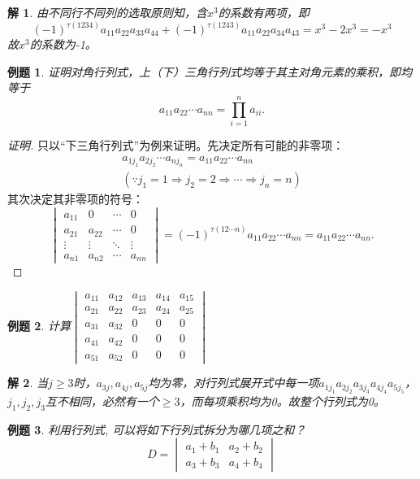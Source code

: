\documentclass[a4paper]{book}
\newtheorem{eg}{例题}[chapter]
\newtheorem*{solution}{解}
\begin{document}
\begin{solution}
由不同行不同列的选取原则知，含$x^3$的系数有两项，即
$$(-1)^{\tau(1234)} a_{11}a_{22}a_{33}a_{44} + (-1)^{\tau(1243)} a_{11}a_{22}a_{34}a_{43} = x^3 - 2x^3 = -x^3$$
故$x^3$的系数为-1。
\end{solution}

\begin{eg}
证明对角行列式，上（下）三角行列式均等于其主对角元素的乘积，即均等于
$$a_{11}a_{22}\cdots a_{nn} = \prod\limits_{i=1}^n a_{ii}.$$
\end{eg}

\begin{proof}[证明]
只以“下三角行列式”为例来证明。先决定所有可能的非零项：
\begin{eqnarray*}
a_{1j_1}a_{2j_2}\cdots a_{nj_n} = a_{11}a_{22}\cdots a_{nn} \\
(\because j_1 = 1 \Rightarrow j_2 = 2 \Rightarrow \cdots \Rightarrow j_n = n)
\end{eqnarray*}
其次决定其非零项的符号：
$$\begin{vmatrix}
a_{11} & 0 & \cdots & 0 \\ a_{21} & a_{22} & \cdots & 0 \\ \vdots & \vdots & \ddots & \vdots \\ a_{n1} & a_{n2} & \cdots & a_{nn} \end{vmatrix} = (-1)^{\tau(12\cdots n)}a_{11}a_{22}\cdots a_{nn} = a_{11}a_{22}\cdots a_{nn}.$$
\end{proof}

\begin{eg}
计算$\begin{vmatrix}
a_{11} & a_{12} & a_{13} & a_{14} & a_{15} \\a_{21} & a_{22} & a_{23} & a_{24} & a_{25} \\ a_{31} & a_{32} & 0 & 0 & 0 \\ a_{41} & a_{42} & 0 & 0 & 0 \\ a_{51} & a_{52} & 0 & 0 & 0 \end{vmatrix}$
\end{eg}

\begin{solution}
当$j\geqslant 3$时，$a_{3j}, a_{4j}, a_{5j}$均为零，对行列式展开式中每一项$a_{1j_1}a_{2j_2}a_{3j_3}a_{4j_4}a_{5j_5}$，$j_1,j_2,j_3$互不相同，必然有一个$\geqslant 3$，而每项乘积均为0。故整个行列式为0。
\end{solution}

\begin{eg}
利用行列式, 可以将如下行列式拆分为哪几项之和？
$$D = \begin{vmatrix}
a_1 + b_1 & a_2 + b_2 \\ a_3 + b_3 & a_4 + b_4 \end{vmatrix}$$
\end{eg}
\end{document}
